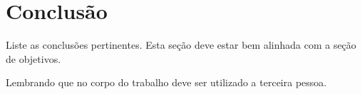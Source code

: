 \section{Conclusão}

Liste as conclusões pertinentes.
Esta seção deve estar bem alinhada com a seção de objetivos.

Lembrando que no corpo do trabalho deve ser utilizado a terceira pessoa.
